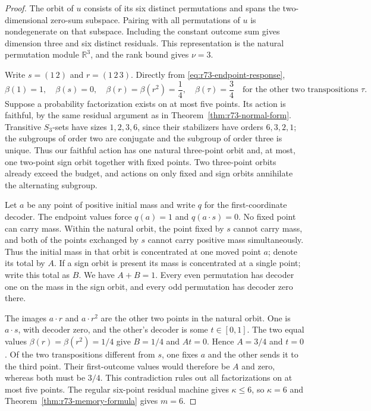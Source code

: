 \begin{proof}
The orbit of $u$ consists of its six distinct permutations and spans the
two-dimensional zero-sum subspace. Pairing with all permutations of $u$
is nondegenerate on that subspace. Including the constant outcome sum gives
dimension three and six distinct residuals. This representation is the
natural permutation module $\mathbb R^3$, and the rank bound gives
$\nu=3$.

Write $s=(1\,2)$ and $r=(1\,2\,3)$. Directly from
\eqref{eq:r73-endpoint-response},
\[
 \beta(1)=1,\quad\beta(s)=0,\quad
 \beta(r)=\beta(r^2)=\frac14,
 \quad\beta(\tau)=\frac34
 \quad\text{for the other two transpositions }\tau.
\]
Suppose a probability factorization exists on at most five points. Its
action is faithful, by the same residual argument as in
Theorem~\ref{thm:r73-normal-form}. Transitive $S_3$-sets have sizes
$1,2,3,6$, since their stabilizers have orders $6,3,2,1$; the subgroups of
order two are conjugate and the subgroup of order three is unique. Thus
our faithful action has one natural three-point orbit and, at most, one
two-point sign orbit together with fixed points. Two three-point orbits
already exceed the budget, and actions on only fixed and sign orbits
annihilate the alternating subgroup.

Let $a$ be any point of positive initial mass and write $q$ for the
first-coordinate decoder. The endpoint values force $q(a)=1$ and
$q(a\cdot s)=0$. No fixed point can carry mass. Within the natural orbit,
the point fixed by $s$ cannot carry mass, and both of the points exchanged
by $s$ cannot carry positive mass simultaneously. Thus the initial mass in
that orbit is concentrated at one moved point $a$; denote its total by
$A$. If a sign orbit is present its mass is concentrated at a single point;
write this total as $B$. We have $A+B=1$. Every even permutation has decoder
one on the mass in the sign orbit, and every odd permutation has decoder
zero there.

The images $a\cdot r$ and $a\cdot r^2$ are the other two points in the
natural orbit. One is $a\cdot s$, with decoder zero, and the other's decoder
is some $t\in[0,1]$. The two equal values $\beta(r)=\beta(r^2)=1/4$ give
$B=1/4$ and $At=0$. Hence $A=3/4$ and $t=0$. Of the two transpositions
different from $s$, one fixes $a$ and the other sends it to the third point.
Their first-outcome values would therefore be $A$ and zero, whereas both
must be $3/4$. This contradiction rules out all factorizations on at most
five points. The regular six-point residual machine gives $\kappa\le6$,
so $\kappa=6$ and Theorem~\ref{thm:r73-memory-formula} gives $m=6$.


\end{proof}
